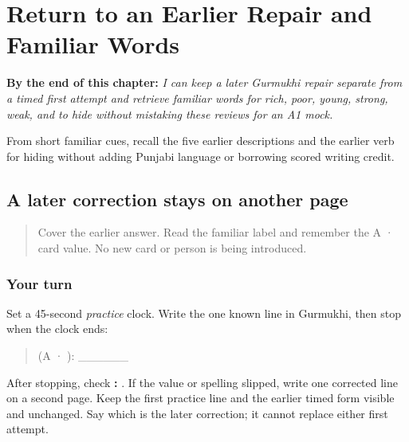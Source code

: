 
\chapter{Return to an Earlier Repair and Familiar Words}
\label{ch:pa-earlier-repair-and-familiar-words}

\begin{chapteropening}
\textbf{By the end of this chapter:} \emph{I can keep a later Gurmukhi repair separate from a timed first attempt and retrieve familiar words for rich, poor, young, strong, weak, and to hide without mistaking these reviews for an A1 mock.}

From short familiar cues, recall the five earlier descriptions and the earlier verb for hiding without adding Punjabi language or borrowing scored writing credit.
\end{chapteropening}

\section[\texorpdfstring{\pa{ਨਾਂ}: \pa{ਅਮਨ} (nāṁ: aman)}{ਨਾਂ: ਅਮਨ (nāṁ: aman)}]{A later correction stays on another page}

\label{lesson:PA-W14-timed-repair-return}



\begin{quote}
Cover the earlier answer. Read the familiar label \textbf{} and remember the A ·  card value. No new card or person is being introduced.
\end{quote}

\subsection*{Your turn}
Set a 45-second \emph{practice} clock. Write the one known line in Gurmukhi, then stop when the clock ends:

\begin{quote}
 (A · ): \_\_\_\_\_\_
\end{quote}

After stopping, check \textbf{: }. If the value or spelling slipped, write one corrected line on a second page. Keep the first practice line and the earlier timed form visible and unchanged. Say which is the later correction; it cannot replace either first attempt.

